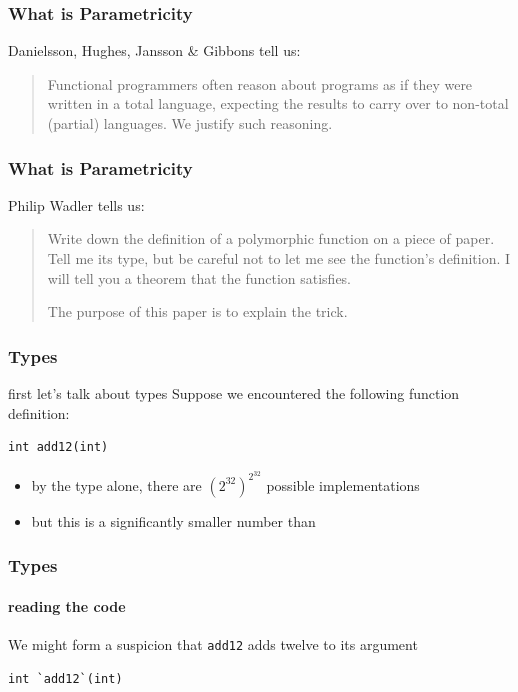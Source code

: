 \begin{frame}
\frametitle{What is Parametricity}
\begin{block}{Danielsson, Hughes, Jansson \& Gibbons \cite{danielsson2006fast} tell us:}
\begin{quotation}
Functional programmers often reason about programs as if
they were written in a total language, expecting the results
to carry over to non-total (partial) languages. We justify
such reasoning.
\end{quotation}
\end{block}
\end{frame}

\begin{frame}
\frametitle{What is Parametricity}
\begin{block}{Philip Wadler \cite{wadler1989theorems} tells us:}
\begin{quotation}
Write down the definition of a polymorphic function on a piece of paper. Tell me its type, but be careful not to let me see the function's definition. I will tell you a theorem that the function satisfies.

The purpose of this paper is to explain the trick.
\end{quotation}
\end{block}
\end{frame}

\begin{frame}[fragile]
\frametitle{Types}
\begin{block}{first let's talk about types}
Suppose we encountered the following function definition:
\begin{lstlisting}
int add12(int)
\end{lstlisting}
\end{block}
\begin{itemize}
  \item<1> by the type alone, there are {$({2^{32}})^{2^{32}}$} possible implementations
  \item<2> but this is a significantly smaller number than 
\end{itemize}
\end{frame}

\begin{frame}[fragile]
\frametitle{Types}
\framesubtitle{reading the code}
We might form a suspicion that \lstinline[style=scala]$add12$ adds twelve to its argument
\begin{lstlisting}[style=scala]
int `add12`(int)
\end{lstlisting}
\end{frame}

